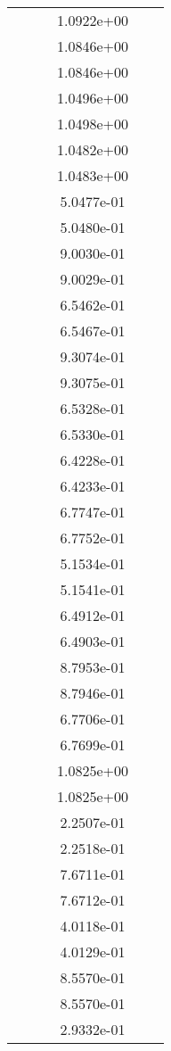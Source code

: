 \begin{xltabular}{\textwidth}{r|rS[table-format=1.3e+2]S[table-format=1.4e+2]S[table-format=1.4e+2]S[table-format=-1.5]}
&  &  & 1.0922e+00 & & \\
&  &  & 1.0846e+00 & & \\
&  &  & 1.0846e+00 & & \\
&  &  & 1.0496e+00 & & \\
&  &  & 1.0498e+00 & & \\
&  &  & 1.0482e+00 & & \\
&  &  & 1.0483e+00 & & \\
&  &  & 5.0477e-01 & & \\
&  &  & 5.0480e-01 & & \\
&  &  & 9.0030e-01 & & \\
&  &  & 9.0029e-01 & & \\
&  &  & 6.5462e-01 & & \\
&  &  & 6.5467e-01 & & \\
&  &  & 9.3074e-01 & & \\
&  &  & 9.3075e-01 & & \\
&  &  & 6.5328e-01 & & \\
&  &  & 6.5330e-01 & & \\
&  &  & 6.4228e-01 & & \\
&  &  & 6.4233e-01 & & \\
&  &  & 6.7747e-01 & & \\
&  &  & 6.7752e-01 & & \\
&  &  & 5.1534e-01 & & \\
&  &  & 5.1541e-01 & & \\
&  &  & 6.4912e-01 & & \\
&  &  & 6.4903e-01 & & \\
&  &  & 8.7953e-01 & & \\
&  &  & 8.7946e-01 & & \\
&  &  & 6.7706e-01 & & \\
&  &  & 6.7699e-01 & & \\
&  &  & 1.0825e+00 & & \\
&  &  & 1.0825e+00 & & \\
&  &  & 2.2507e-01 & & \\
&  &  & 2.2518e-01 & & \\
&  &  & 7.6711e-01 & & \\
&  &  & 7.6712e-01 & & \\
&  &  & 4.0118e-01 & & \\
&  &  & 4.0129e-01 & & \\
&  &  & 8.5570e-01 & & \\
&  &  & 8.5570e-01 & & \\
&  &  & 2.9332e-01 & & \\

\end{xltabular}
